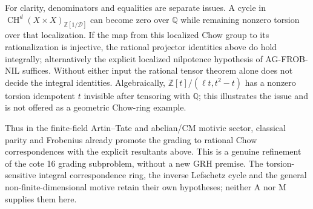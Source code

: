 For clarity, denominators and equalities are separate
issues.  A cycle in
$\operatorname{CH}^d(X\times X)_{\mathbb Z[1/\mathcal D]}$
can become zero over $\mathbb Q$ while remaining
nonzero torsion over that localization.  If the map
from this localized Chow group to its rationalization
is injective, the rational projector identities
above do hold integrally; alternatively the explicit
localized nilpotence hypothesis of AG-FROB-NIL suffices.
Without either input the rational tensor theorem alone
does not decide the integral identities.  Algebraically,
$\mathbb Z[t]/(\ell t,t^2-t)$ has a nonzero torsion
idempotent $t$ invisible after tensoring with $\mathbb Q$;
this illustrates the issue and is not offered as a
geometric Chow-ring example.

Thus in the finite-field Artin--Tate and abelian/CM
motivic sector, classical parity and Frobenius already
promote the grading to rational Chow correspondences
with the explicit resultants above.  This is a genuine
refinement of the cote 16 grading subproblem, without
a new GRH premise.  The torsion-sensitive integral
correspondence ring, the inverse Lefschetz cycle and
the general non-finite-dimensional motive retain their
own hypotheses; neither A nor M supplies them here.

